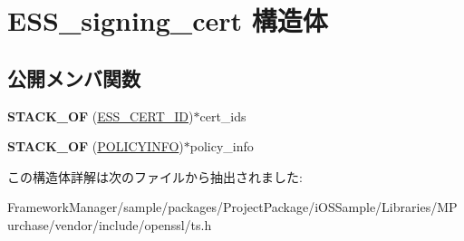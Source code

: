 \hypertarget{struct_e_s_s__signing__cert}{}\section{E\+S\+S\+\_\+signing\+\_\+cert 構造体}
\label{struct_e_s_s__signing__cert}
\subsection*{公開メンバ関数}
\begin{DoxyCompactItemize}
\item 
\hypertarget{struct_e_s_s__signing__cert_adc65a8a4258b4ba71be05583db0c0033}{}{\bfseries S\+T\+A\+C\+K\+\_\+\+O\+F} (\hyperlink{struct_e_s_s__cert__id}{E\+S\+S\+\_\+\+C\+E\+R\+T\+\_\+\+I\+D})$\ast$cert\+\_\+ids\label{struct_e_s_s__signing__cert_adc65a8a4258b4ba71be05583db0c0033}

\item 
\hypertarget{struct_e_s_s__signing__cert_a1ccf25cac96a30664efbe004ba9af769}{}{\bfseries S\+T\+A\+C\+K\+\_\+\+O\+F} (\hyperlink{struct_p_o_l_i_c_y_i_n_f_o__st}{P\+O\+L\+I\+C\+Y\+I\+N\+F\+O})$\ast$policy\+\_\+info\label{struct_e_s_s__signing__cert_a1ccf25cac96a30664efbe004ba9af769}

\end{DoxyCompactItemize}


この構造体詳解は次のファイルから抽出されました\+:\begin{DoxyCompactItemize}
\item 
Framework\+Manager/sample/packages/\+Project\+Package/i\+O\+S\+Sample/\+Libraries/\+M\+Purchase/vendor/include/openssl/ts.\+h\end{DoxyCompactItemize}

